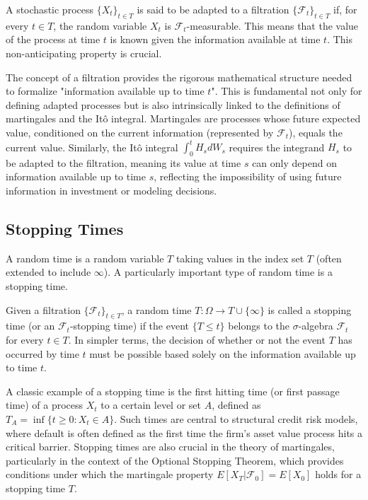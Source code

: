 \documentclass[11pt,twoside,openright]{report}
\begin{document}
A stochastic process $\{X_t\}_{t \in T}$ is said to be adapted to a filtration $\{\mathcal{F}_t\}_{t \in T}$ if, for every $t \in T$, the random variable $X_t$ is $\mathcal{F}_t$-measurable. This means that the value of the process at time $t$ is known given the information available at time $t$. This non-anticipating property is crucial.

The concept of a filtration provides the rigorous mathematical structure needed to formalize "information available up to time $t$". This is fundamental not only for defining adapted processes but is also intrinsically linked to the definitions of martingales and the Itô integral. Martingales are processes whose future expected value, conditioned on the current information (represented by $\mathcal{F}_t$), equals the current value. Similarly, the Itô integral $\int_0^t H_s dW_s$ requires the integrand $H_s$ to be adapted to the filtration, meaning its value at time $s$ can only depend on information available up to time $s$, reflecting the impossibility of using future information in investment or modeling decisions.

\subsection{Stopping Times}
\label{subsec:stopping_times}

A random time is a random variable $T$ taking values in the index set $T$ (often extended to include $\infty$). A particularly important type of random time is a stopping time.

Given a filtration $\{\mathcal{F}_t\}_{t \in T}$, a random time $T: \Omega \to T \cup \{\infty\}$ is called a stopping time (or an $\mathcal{F}_t$-stopping time) if the event $\{T \le t\}$ belongs to the $\sigma$-algebra $\mathcal{F}_t$ for every $t \in T$. In simpler terms, the decision of whether or not the event $T$ has occurred by time $t$ must be possible based solely on the information available up to time $t$.

A classic example of a stopping time is the first hitting time (or first passage time) of a process $X_t$ to a certain level or set $A$, defined as $T_A = \inf\{t \ge 0 : X_t \in A\}$. Such times are central to structural credit risk models, where default is often defined as the first time the firm's asset value process hits a critical barrier. Stopping times are also crucial in the theory of martingales, particularly in the context of the Optional Stopping Theorem, which provides conditions under which the martingale property $E[X_T | \mathcal{F}_0] = E[X_0]$ holds for a stopping time $T$.
\end{document}
